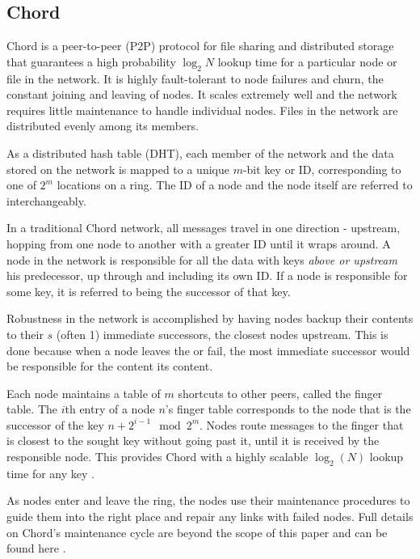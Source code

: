 \documentclass[10pt, conference, compsocconf]{IEEEtran}
\begin{document}
\subsection{Chord}
Chord \cite{Chord} is a peer-to-peer (P2P) protocol for file sharing and distributed storage that guarantees a high probability $\log_{2} N$ lookup time for a particular node or file in the network. 
It is highly fault-tolerant to node failures and churn, the constant joining and leaving of nodes.  It scales extremely well and the network requires little maintenance to handle individual nodes.  
Files in the network are distributed evenly among its members.

As a distributed hash table (DHT), each member of the network and the data stored on the network is mapped to a unique $m$-bit key or ID, corresponding to one of  $2^m$ locations on a ring. 
The ID of a node and the node itself are referred to interchangeably.

In a traditional Chord network, all messages travel in one direction - upstream, hopping from one node to another with a greater ID until it wraps around.
A node in the network is responsible for all the data with keys \textit{above or upstream} his predecessor, up through and including its own ID.  If a node is responsible for some key, it is referred to being the successor of that key.

Robustness in the network is accomplished by having nodes backup their contents to their $s$ (often 1) immediate successors, the closest nodes upstream.  
This is done because when a node leaves the or fail, the most immediate successor would be responsible for the content its content.

Each node maintains a table of $m$ shortcuts to other peers, called the finger table.   The $i$th entry of a node $n$'s finger table corresponds to the node that is the successor of the key $n+2^{i-1} \mod 2^m $.  Nodes route messages to the finger that is closest to the sought key without going past it, until it is received by the responsible node.  This provides Chord with a highly scalable $\log_2(N)$ lookup time for any key \cite{Chord}.

As nodes enter and leave the ring, the nodes use their maintenance procedures to guide them into the right place and repair any links with failed nodes.  Full details on Chord's maintenance cycle are beyond the scope of this paper and can be found here \cite{Chord}.
\end{document}

